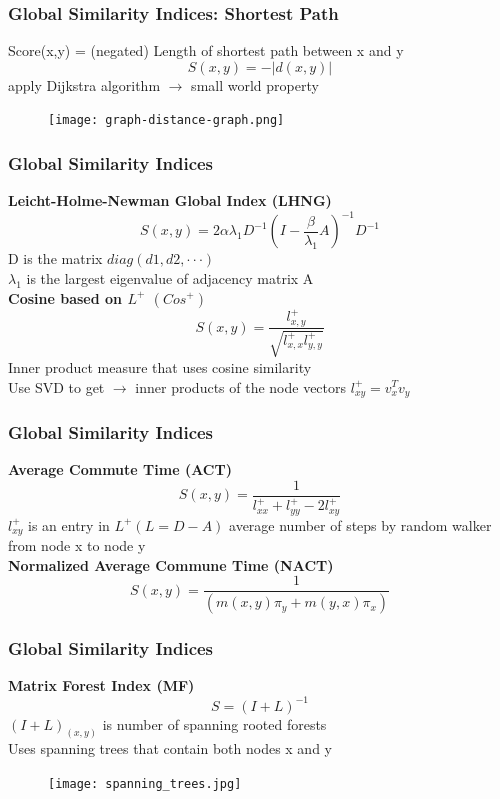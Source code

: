 \documentclass{beamer}
\begin{document}
\begin{frame}
  \frametitle{Global Similarity Indices: Shortest Path} 
    Score(x,y) = (negated) Length of shortest path between x and y
    \[S(x,y) = -|d(x,y)|\]
    apply Dijkstra algorithm $\rightarrow$ small world property
    
\begin{figure}
\centering
  \texttt{[image: graph-distance-graph.png]}
  \label{fig:shortest_path}
\end{figure}
   
\end{frame}


\begin{frame}
  \frametitle{Global Similarity Indices} 
    \textbf{Leicht-Holme-Newman Global Index (LHNG)}
    \[S(x,y) = 2\alpha \lambda_{1}D^{-1}(I-\frac{\beta}{\lambda_{1}}A)^{-1}D^{-1}\]
    D is the matrix $diag(d1,d2,\cdot\cdot\cdot)$\\
    $\lambda_{1}$ is the largest eigenvalue of adjacency matrix A
    \\
    \textbf{Cosine based on $L^{+}$ $(Cos^{+})$}
    \[S(x,y) = \dfrac{l_{x,y}^{+}}{\sqrt{l_{x,x}^{+} l_{y,y}^{+}}}\]
    Inner product measure that uses cosine similarity\\
    Use SVD to get $\rightarrow$ inner products of the node vectors $l_{xy}^{+} = v_{x}^{T}v_{y}$
\end{frame}

\begin{frame}
  \frametitle{Global Similarity Indices}
    \textbf{Average Commute Time (ACT)}
    \[S(x,y) = \dfrac{1}{l_{xx}^{+} + l_{yy}^{+} - 2l_{xy}^{+}}\]
    $l_{xy}^{+}$ is an entry in $L^{+} (L=D-A)$
    average number of steps by random walker from node x to node y\\
    \textbf{Normalized Average Commune Time (NACT)}
    \[S(x,y) = \dfrac{1}{(m(x,y)\pi_{y} + m(y,x)\pi_{x})}\]
\end{frame}

\begin{frame}
  \frametitle{Global Similarity Indices}
    \textbf{Matrix Forest Index (MF)}
    \[S = (I + L)^{-1}\]
    $(I+L)_{(x,y)}$ is number of spanning rooted forests\\
    Uses spanning trees that contain both nodes x and y
\begin{figure}
  \centering
  \texttt{[image: spanning\_trees.jpg]}
  \label{fig:spanning_trees}
\end{figure}
\end{frame}
\end{document}
